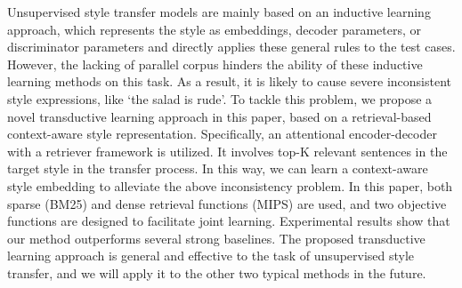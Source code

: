 Unsupervised style transfer models are mainly based on an inductive learning approach, which represents the style as embeddings, decoder parameters, or discriminator parameters and directly applies these general rules to the test cases. However, the lacking of parallel corpus hinders the ability of these inductive learning methods on this task. As a result, it is likely to cause severe inconsistent style expressions, like ‘the salad is rude'. To tackle this problem, we propose a novel transductive learning approach in this paper, based on a retrieval-based context-aware style representation. Specifically, an attentional encoder-decoder with a retriever framework is utilized. It involves top-K relevant sentences in the target style in the transfer process. In this way, we can learn a context-aware style embedding to alleviate the above inconsistency problem. In this paper, both sparse (BM25) and dense retrieval functions (MIPS) are used, and two objective functions are designed to facilitate joint learning. Experimental results show that our method outperforms several strong baselines. The proposed transductive learning approach is general and effective to the task of unsupervised style transfer, and we will apply it to the other two typical methods in the future.
